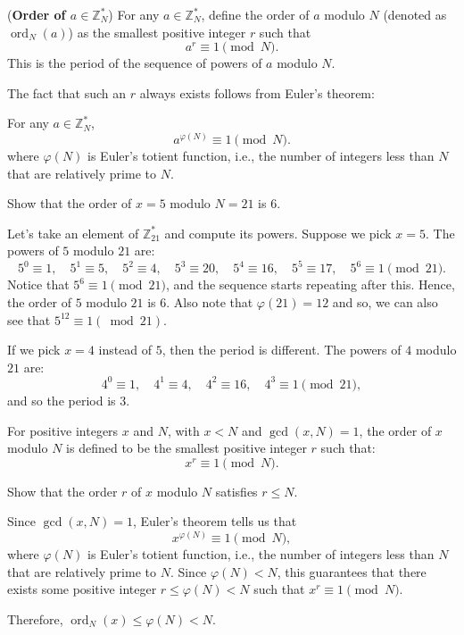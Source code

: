 \begin{definition}
    (\textbf{Order of $a \in \mathbb{Z}_N^*$}) For any $a \in \mathbb{Z}_N^*$, define the order of $a$ modulo $N$ (denoted as $\operatorname{ord}_N(a)$) as the smallest positive integer $r$ such that
    \[
        a^r \equiv 1 \pmod{N}.
    \]
    This is the period of the sequence of powers of $a$ modulo $N$.
\end{definition}

The fact that such an $r$ always exists follows from Euler's theorem:

\begin{theorem}
    For any $a \in \mathbb{Z}_N^*$,
    \[
    a^{\varphi(N)} \equiv 1 \pmod{N}.
    \]
    where $\varphi(N)$ is Euler’s totient function, i.e., the number of integers less than $N$ that are relatively prime to $N$.
\end{theorem}

\begin{example}
    Show that the order of $x = 5$ modulo $N = 21$ is $6$.

    Let's take an element of $\mathbb{Z}_{21}^*$ and compute its powers. Suppose we pick $x = 5$. The powers of $5$ modulo $21$ are:
    \[
    5^0 \equiv 1,\quad 5^1 \equiv 5,\quad 5^2 \equiv 4,\quad 5^3 \equiv 20,\quad 5^4 \equiv 16,\quad 5^5 \equiv 17,\quad 5^6 \equiv 1 \pmod{21}.
    \]
    Notice that $5^6 \equiv 1 \pmod{21}$, and the sequence starts repeating after this. Hence, the order of $5$ modulo $21$ is $6$. Also note that $\varphi(21)=12$ and so, we can also see that $5^{12} \equiv 1 (\bmod 21)$.
\end{example}

\noindent
If we pick $x = 4$ instead of $5$, then the period is different. The powers of $4$ modulo $21$ are:
\[
4^0 \equiv 1,\quad 4^1 \equiv 4,\quad 4^2 \equiv 16,\quad 4^3 \equiv 1 \pmod{21},
\]
and so the period is $3$.

\medskip

\noindent
For positive integers $x$ and $N$, with $x < N$ and $\gcd(x, N) = 1$, the order of $x$ modulo $N$ is defined to be the smallest positive integer $r$ such that:
\[
x^r \equiv 1 \pmod{N}.
\]

\begin{example}
    Show that the order $r$ of $x$ modulo $N$ satisfies $r \leq N$.

    Since $\gcd(x, N) = 1$, Euler’s theorem tells us that
    \[
    x^{\varphi(N)} \equiv 1 \pmod{N},
    \]
    where $\varphi(N)$ is Euler’s totient function, i.e., the number of integers less than $N$ that are relatively prime to $N$. Since $\varphi(N) < N$, this guarantees that there exists some positive integer $r \leq \varphi(N) < N$ such that $x^r \equiv 1 \pmod{N}$.

    Therefore, $\operatorname{ord}_N(x) \leq \varphi(N) < N$.
\end{example}

